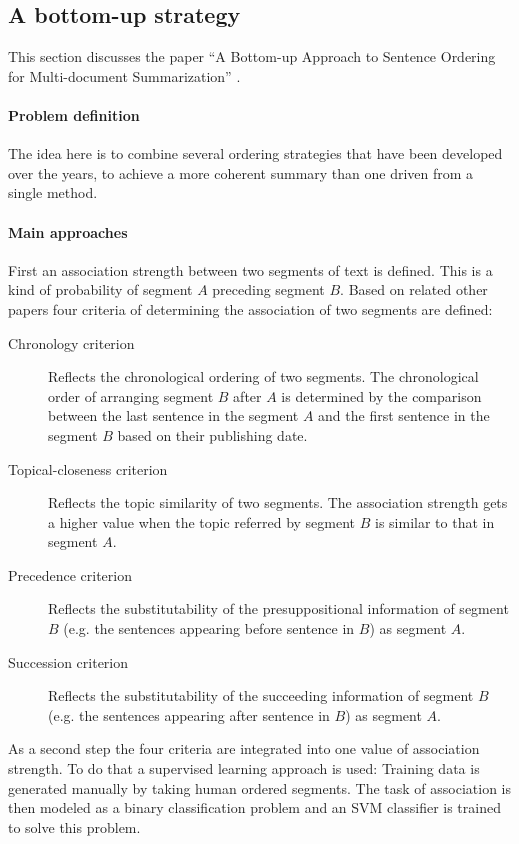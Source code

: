 \documentclass[11pt]{article}
\begin{document}
\subsection{A bottom-up strategy}
This section discusses the paper ``A Bottom-up Approach to Sentence Ordering for Multi-document
Summarization'' \cite{Bollegala201089}.
\paragraph{Problem definition} The idea here is to combine several ordering strategies that have
been developed over the years, to achieve a more coherent summary than one driven from a single method.
\paragraph{Main approaches} First an association strength between two segments of text is defined.
This is a kind of probability of segment $A$ preceding segment $B$. Based on related other papers
four criteria of determining the association of two segments are defined:
\begin{description}
    \item[Chronology criterion] Reflects the chronological ordering of two segments. The
        chronological order of arranging segment $B$ after $A$ is determined by the comparison between
        the last sentence in the segment $A$ and the first sentence in the segment $B$ based on their
        publishing date.
    \item[Topical-closeness criterion] Reflects the topic similarity of two segments. The
        association strength gets a higher value when the topic referred by segment $B$ is similar to
        that in segment $A$.
    \item[Precedence criterion] Reflects the substitutability of the presuppositional information
        of segment $B$ (e.g. the sentences appearing before sentence in $B$) as segment $A$.
    \item[Succession criterion] Reflects the substitutability of the succeeding information of
        segment $B$ (e.g. the sentences appearing after sentence in $B$) as segment $A$.
\end{description}

As a second step the four criteria are integrated into one value of association strength. To do that
a supervised learning approach is used: Training data is generated manually by taking human
ordered segments. The task of association is then modeled as a binary classification problem and an
SVM classifier is trained to solve this problem.
\end{document}
